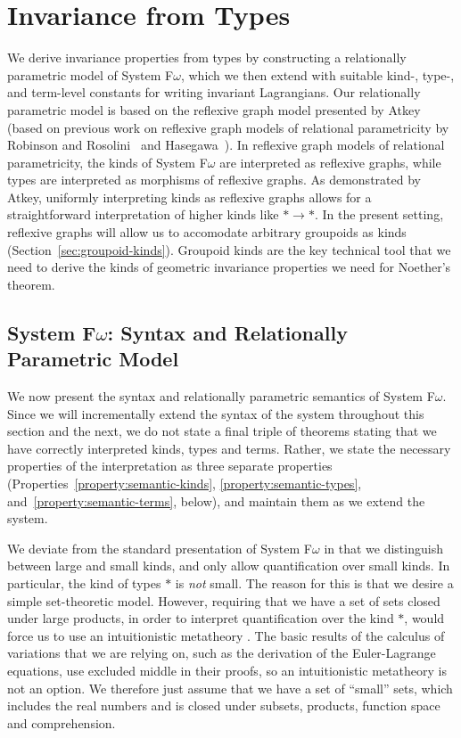 \documentclass[preprint]{sigplanconf}
\theoremstyle{examplestyle}
\begin{document}
\section{Invariance from Types}
\label{sec:symmetry-from-types}

We derive invariance properties from types by constructing a
relationally parametric model of System F$\omega$, which we then
extend with suitable kind-, type-, and term-level constants for
writing invariant Lagrangians. Our relationally parametric model is
based on the reflexive graph model presented by
Atkey~\cite{atkey12relational} (based on previous work on reflexive
graph models of relational parametricity by Robinson and
Rosolini~\cite{robinson94reflexive} and
Hasegawa~\cite{hasegawa94relational}). In reflexive graph models of
relational parametricity, the kinds of System F$\omega$ are
interpreted as reflexive graphs, while types are interpreted as
morphisms of reflexive graphs. As demonstrated by Atkey, uniformly
interpreting kinds as reflexive graphs allows for a straightforward
interpretation of higher kinds like $* \to *$. In the present setting,
reflexive graphs will allow us to accomodate arbitrary groupoids as
kinds (Section~\ref{sec:groupoid-kinds}). Groupoid kinds are the key
technical tool that we need to derive the kinds of geometric
invariance properties we need for Noether's theorem.

\subsection{System F$\omega$: Syntax and Relationally Parametric Model}
\label{sec:refl-graphs-for-fomega}

We now present the syntax and relationally parametric semantics of
System F$\omega$. Since we will incrementally extend the syntax of the
system throughout this section and the next, we do not state a final
triple of theorems stating that we have correctly interpreted kinds,
types and terms. Rather, we state the necessary properties of the
interpretation as three separate properties
(Properties~\ref{property:semantic-kinds},
\ref{property:semantic-types}, and~\ref{property:semantic-terms},
below), and maintain them as we extend the system.

We deviate from the standard presentation of System F$\omega$ in that
we distinguish between large and small kinds, and only allow
quantification over small kinds. In particular, the kind of types $*$
is \emph{not} small. The reason for this is that we desire a simple
set-theoretic model. However, requiring that we have a set of sets
closed under large products, in order to interpret quantification over
the kind $*$, would force us to use an intuitionistic metatheory
\cite{pitts87polymorphism}. The basic results of the calculus of
variations that we are relying on, such as the derivation of the
Euler-Lagrange equations, use excluded middle in their proofs, so an
intuitionistic metatheory is not an option. We therefore just assume
that we have a set of ``small'' sets, which includes the real numbers
and is closed under subsets, products, function space and
comprehension.
\end{document}

